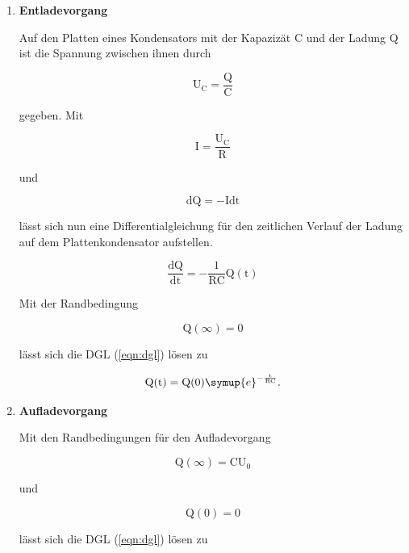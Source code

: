 \begin{enumerate}
\item \textbf{Entladevorgang}

Auf den Platten eines Kondensators mit der Kapazizät C und der Ladung Q ist die Spannung zwischen ihnen durch

\begin{equation}
\text{U}_\text{C}=\frac{\text{Q}}{\text{C}}
\label{eqn:u}
\end{equation}

gegeben.
Mit

\begin{equation}
\text{I}=\frac{\text{U}_\text{C}}{\text{R}}
\label{eqn:i}
\end{equation}

und

\begin{equation}
\text{dQ}=-\text{Idt}
\label{eqn:dq}
\end{equation}

lässt sich nun eine Differentialgleichung für den zeitlichen Verlauf der Ladung auf dem Plattenkondensator aufstellen.

\begin{equation}
\frac{\text{dQ}}{\text{dt}}=-\frac{1}{\text{RC}} \text{Q}(\text{t})
\label{eqn:dgl}
\end{equation}

Mit der Randbedingung 

\begin{equation}
\text{Q}(\infty)=0
\end{equation}

lässt sich die DGL (\ref{eqn:dgl}) lösen zu

\begin{equation}
\text{Q}(\text{t}) = \text{Q}(0) \symup{e}^{-\frac{\text{t}}{\text{RC}}}.
\end{equation}

\item \textbf{Aufladevorgang}

Mit den Randbedingungen für den Aufladevorgang

\begin{equation}
\text{Q}(\infty)=\text{CU}_0
\end{equation}

und 

\begin{equation}
\text{Q}(0)=0
\end{equation}


lässt sich die DGL (\ref{eqn:dgl}) lösen zu


\end{enumerate}
